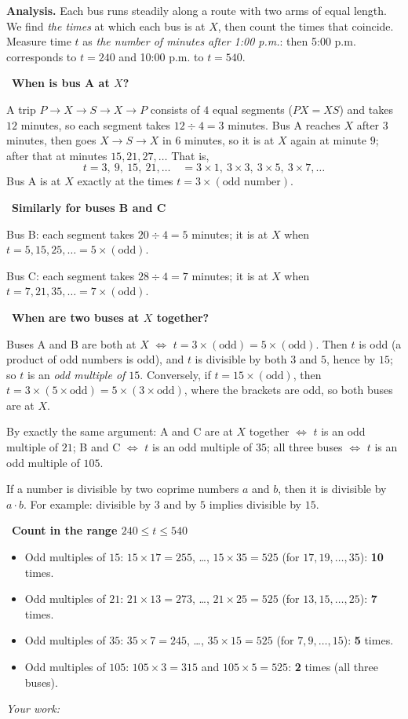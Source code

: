 \documentclass[11pt]{article}
\newif\ifsol \solfalse
\newcommand{\StuProb}[2]{\begin{probboxS}{#1}{#2}\StuProbBody\end{probboxS}}
\newcommand{\probsol}[1]{%
  \begin{lrbox}{\solmeasure}\begin{minipage}{\dimexpr\linewidth-24pt\relax}#1\end{minipage}\end{lrbox}%
  \ifsol
    \begin{solbox}#1\end{solbox}%
  \else
    \setlength{\solht}{\dimexpr\ht\solmeasure+\dp\solmeasure+0.85cm\relax}%
    \ifdim\solht<1.35cm\setlength{\solht}{1.35cm}\fi
    \ifdim\solht>\StudentMaxWork\setlength{\solht}{\StudentMaxWork}\fi
    \par\noindent\begin{minipage}{\linewidth}%
    \expandafter\StuProb\StuProbArgs
    \begin{tcolorbox}[colback=white,colframe=Line,boxrule=0.8pt,arc=5pt,
      left=8pt,right=8pt,top=4pt,bottom=4pt,height=\solht]{\footnotesize\color{Slate}\itshape\WorkWord}\end{tcolorbox}%
    \end{minipage}\par\medskip
  \fi}
\newlength{\StudentMaxWork}\setlength{\StudentMaxWork}{4.5cm}
\newcommand{\step}[2]{\par\smallskip\noindent{\bfseries\color{tmBlue!85!black}\StepWord~#1.}\ {\bfseries #2}\par\nopagebreak}
\def\WorkWord{Your work:}
\def\StepWord{Step}
\begin{document}
\probsol{
\textbf{Analysis.} Each bus runs steadily along a route with two arms of equal length. We find \emph{the times} at which each bus is at $X$, then count the times that coincide. Measure time $t$ as \emph{the number of minutes after 1:00 p.m.}: then 5:00 p.m. corresponds to $t=240$ and 10:00 p.m. to $t=540$.

\step{1}{When is bus A at $X$?}
A trip $P\to X\to S\to X\to P$ consists of $4$ equal segments ($PX=XS$) and takes $12$ minutes, so each segment takes $12\div 4=3$ minutes. Bus A reaches $X$ after $3$ minutes, then goes $X\to S\to X$ in $6$ minutes, so it is at $X$ again at minute $9$; after that at minutes $15, 21, 27,\dots$ That is,
\[ t=3,\ 9,\ 15,\ 21,\dots \quad = 3\times 1,\ 3\times 3,\ 3\times 5,\ 3\times 7,\dots \]
Bus A is at $X$ exactly at the times $t=3\times(\text{odd number})$.

\step{2}{Similarly for buses B and C}
Bus B: each segment takes $20\div 4=5$ minutes; it is at $X$ when $t=5,15,25,\dots=5\times(\text{odd})$.\par
Bus C: each segment takes $28\div 4=7$ minutes; it is at $X$ when $t=7,21,35,\dots=7\times(\text{odd})$.

\step{3}{When are two buses at $X$ together?}
\begin{proofbox}Buses A and B are both at $X$ $\iff$ $t=3\times(\text{odd})=5\times(\text{odd})$. Then $t$ is odd (a product of odd numbers is odd), and $t$ is divisible by both $3$ and $5$, hence by $15$; so $t$ is an \emph{odd multiple of $15$}. Conversely, if $t=15\times(\text{odd})$, then $t=3\times(5\times\text{odd})=5\times(3\times\text{odd})$, where the brackets are odd, so both buses are at $X$.\end{proofbox}
By exactly the same argument: A and C are at $X$ together $\iff$ $t$ is an odd multiple of $21$; B and C $\iff$ $t$ is an odd multiple of $35$; all three buses $\iff$ $t$ is an odd multiple of $105$.
\begin{recallbox}If a number is divisible by two coprime numbers $a$ and $b$, then it is divisible by $a\cdot b$. For example: divisible by $3$ and by $5$ implies divisible by $15$.\end{recallbox}

\step{4}{Count in the range $240\le t\le 540$}
\begin{itemize}[leftmargin=1.3em,itemsep=1pt]
\item Odd multiples of $15$: $15\times 17=255$, \dots, $15\times 35=525$ (for $17,19,\dots,35$): \textbf{10} times.
\item Odd multiples of $21$: $21\times 13=273$, \dots, $21\times 25=525$ (for $13,15,\dots,25$): \textbf{7} times.
\item Odd multiples of $35$: $35\times 7=245$, \dots, $35\times 15=525$ (for $7,9,\dots,15$): \textbf{5} times.
\item Odd multiples of $105$: $105\times 3=315$ and $105\times 5=525$: \textbf{2} times (all three buses).
\end{itemize}

}
\end{document}
